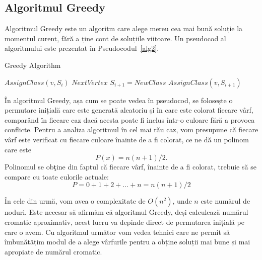\documentclass[runningheads]{paper}
\begin{document}
\subsection{Algoritmul Greedy}
Algoritmul Greedy este un algoritm care alege mereu cea mai bună soluție la
momentul curent, fără a ține cont de soluțiile viitoare.
Un pseudocod al algoritmului este prezentat în
Pseudocodul~\ref{alg2}.


\begin{algorithm} 
\caption{Greedy Algorithm}
\label{alg2}
\begin{algorithmic}[1]
\State $AssignClass(v, S_i)$
\State $Next Vertex$
\EndIf
\EndFor
{}
\State $S_{i+1} = NewClass$
\State $AssignClass(v, S_{i+1})$
\EndIf
\EndFor
\EndProcedure
\end{algorithmic}
\end{algorithm}

În algoritmul Greedy, așa cum se poate vedea în pseudocod,
se folosește o permutare inițială care este generată aleatoriu și în
care este colorat fiecare vârf, comparând în fiecare caz dacă acesta
poate fi inclus într-o culoare fără a provoca conflicte. Pentru a analiza
algoritmul în cel mai rău caz, vom presupune că fiecare vârf este 
verificat cu fiecare culoare înainte de a fi colorat,
ce ne dă un polinom care este
\begin{equation} P(x) = n(n+1)/2. \end{equation} Polinomul
se obţine din faptul că fiecare vârf, înainte de a fi colorat,
trebuie să se compare cu toate culorile actuale:
\begin{equation} P = 0 + 1 + 2 + . . . + n = n(n + 1)/2 \end{equation}

În cele din urmă, vom avea o complexitate de $O(n^2)$, unde $n$ este numărul
de noduri. Este necesar să afirmăm că algoritmul Greedy, deși calculează
numărul cromatic aproximativ, acest lucru va depinde direct de permutarea
inițială pe care o avem. Cu algoritmul următor vom vedea tehnici care ne
permit să îmbunătățim modul de a alege vârfurile pentru a obține soluții
mai bune și mai apropiate de numărul cromatic.
\end{document}

